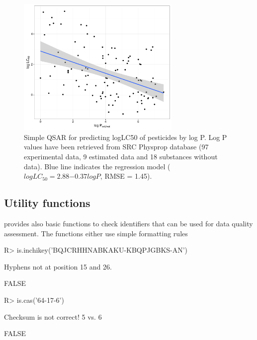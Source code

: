 \documentclass[article, shortnames]{jss}\usepackage[]{graphicx}\usepackage[]{color}
\providecommand{\DIFadd}[1]{{\protect\color{blue}\uwave{#1}}} %
\providecommand{\DIFaddbegin}{} %
\begin{document}
\begin{figure}[ht]
\begin{CodeChunk}


{\centering \includegraphics[width=0.7\textwidth]{plot_qsar-1} 

}

\end{CodeChunk}
\caption{Simple QSAR for predicting logLC50 of pesticides by log P. 
Log P values have been retrieved from SRC Physprop database (97 experimental data, 9 estimated data and 18 substances without data). 
Blue line indicates the regression model ($log LC_{50} = 2.88\ensuremath{-0.37} logP$, RMSE = 1.45).}
\label{fig:fig3}
\end{figure}


\subsection[Utility functions]{Utility functions}
 provides also basic functions to check identifiers that can be used for data quality assessment.
The functions either use simple formatting rules\DIFaddbegin \DIFadd{,
}

\begin{CodeChunk}
\begin{CodeInput}
R> is.inchikey('BQJCRHHNABKAKU-KBQPJGBKS-AN')
\end{CodeInput}
\begin{CodeOutput}
Hyphens not at position 15 and 26.
\end{CodeOutput}
\begin{CodeOutput}
[1] FALSE
\end{CodeOutput}
\begin{CodeInput}
R> is.cas('64-17-6')
\end{CodeInput}
\begin{CodeOutput}
Checksum is not correct! 5 vs. 6
\end{CodeOutput}
\begin{CodeOutput}
[1] FALSE
\end{CodeOutput}
\end{CodeChunk}
\end{document}
